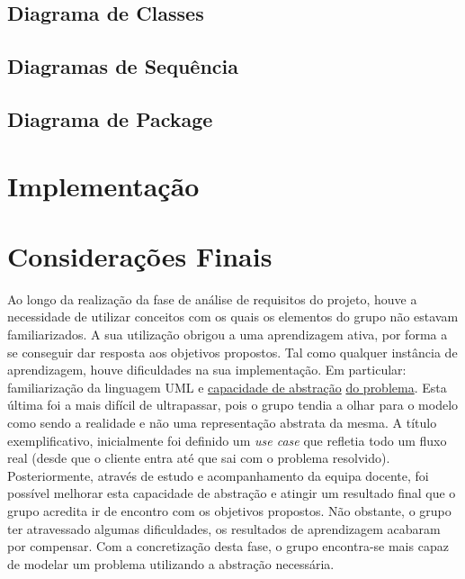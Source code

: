 \documentclass[a4paper,12pt]{scrreprt}
\begin{document}
\section{Diagrama de Classes} \label{sec:diagrama_classe}



\section{Diagramas de Sequência} \label{sec:diagrama_sequencia}


\section{Diagrama de Package} \label{sec:diagrama_package}


\chapter{Implementação} \label{chap:implementacao}



\chapter{Considerações Finais}
Ao longo da realização da fase de análise de requisitos do projeto, houve a necessidade de utilizar conceitos
com os quais os elementos do grupo não estavam familiarizados.
A sua utilização obrigou a uma aprendizagem ativa, por forma a se conseguir dar resposta aos objetivos propostos.
Tal como qualquer instância de aprendizagem, houve dificuldades na sua implementação.
Em particular: familiarização da linguagem UML e \underline{capacidade de abstração} \underline{do problema}.
Esta última foi a mais difícil de ultrapassar, pois o grupo tendia a olhar para o modelo como sendo a realidade
e não uma representação abstrata da mesma.
A título exemplificativo, inicialmente foi definido um \textit{use case} que refletia todo um fluxo real
(desde que o cliente entra até que sai com o problema resolvido).
Posteriormente, através de estudo e acompanhamento da equipa docente, foi possível melhorar esta capacidade de abstração
e atingir um resultado final que o grupo acredita ir de encontro com os objetivos propostos.
Não obstante, o grupo ter atravessado algumas dificuldades, os resultados de aprendizagem acabaram por compensar.
Com a concretização desta fase, o grupo encontra-se mais capaz de modelar um problema utilizando a abstração necessária.
\end{document}
